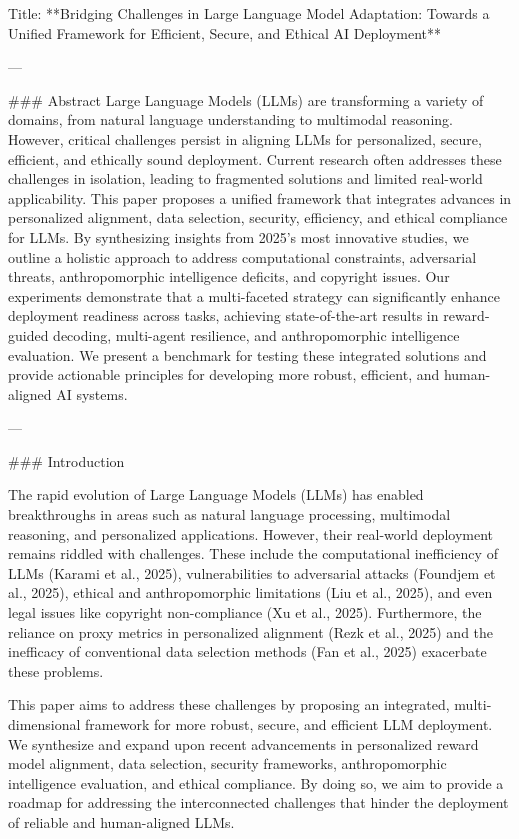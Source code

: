 Title: **Bridging Challenges in Large Language Model Adaptation: Towards a Unified Framework for Efficient, Secure, and Ethical AI Deployment**

---

### Abstract  
Large Language Models (LLMs) are transforming a variety of domains, from natural language understanding to multimodal reasoning. However, critical challenges persist in aligning LLMs for personalized, secure, efficient, and ethically sound deployment. Current research often addresses these challenges in isolation, leading to fragmented solutions and limited real-world applicability. This paper proposes a unified framework that integrates advances in personalized alignment, data selection, security, efficiency, and ethical compliance for LLMs. By synthesizing insights from 2025's most innovative studies, we outline a holistic approach to address computational constraints, adversarial threats, anthropomorphic intelligence deficits, and copyright issues. Our experiments demonstrate that a multi-faceted strategy can significantly enhance deployment readiness across tasks, achieving state-of-the-art results in reward-guided decoding, multi-agent resilience, and anthropomorphic intelligence evaluation. We present a benchmark for testing these integrated solutions and provide actionable principles for developing more robust, efficient, and human-aligned AI systems.

---

### Introduction  

The rapid evolution of Large Language Models (LLMs) has enabled breakthroughs in areas such as natural language processing, multimodal reasoning, and personalized applications. However, their real-world deployment remains riddled with challenges. These include the computational inefficiency of LLMs (Karami et al., 2025), vulnerabilities to adversarial attacks (Foundjem et al., 2025), ethical and anthropomorphic limitations (Liu et al., 2025), and even legal issues like copyright non-compliance (Xu et al., 2025). Furthermore, the reliance on proxy metrics in personalized alignment (Rezk et al., 2025) and the inefficacy of conventional data selection methods (Fan et al., 2025) exacerbate these problems.  

This paper aims to address these challenges by proposing an integrated, multi-dimensional framework for more robust, secure, and efficient LLM deployment. We synthesize and expand upon recent advancements in personalized reward model alignment, data selection, security frameworks, anthropomorphic intelligence evaluation, and ethical compliance. By doing so, we aim to provide a roadmap for addressing the interconnected challenges that hinder the deployment of reliable and human-aligned LLMs.


